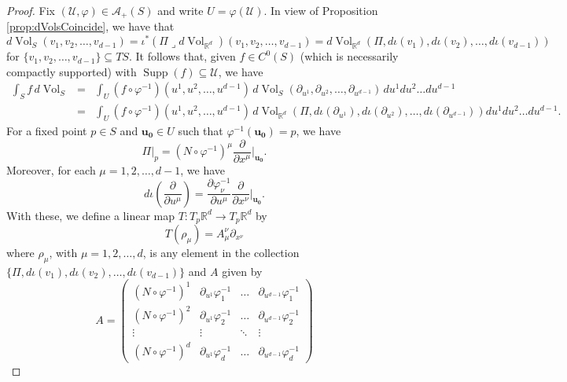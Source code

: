\documentclass{article}
\newcommand\supp{\operatorname{Supp}}
\newcommand{\p}{\partial}
\newcommand{\R}{\mathbb{R}}
\newcommand{\f}[2]{\frac{#1}{#2}}
\newcommand{\lp}{\left(}
\newcommand{\rp}{\right)}
\newcommand{\iprod}{\mathbin{\lrcorner}}
\theoremstyle{theorem}
\newcommand{\Vol}{\operatorname{Vol}}
\begin{document}
\begin{proof}
Fix $(\mathcal{U}, \varphi)\in\mathcal{A}_+(S)$ and write $U=\varphi(\mathcal{U})$. In view of Proposition \ref{prop:dVolsCoincide}, we have that
\begin{equation*}
    d\Vol_S(v_1,v_2,\dots, v_{d-1}) = \iota^*(\Pi \iprod d\Vol_{\R^d})(v_1,v_2,\dots, v_{d-1}) = d\Vol_{\R^d}(\Pi, d\iota(v_1),d\iota(v_2),\dots, d\iota(v_{d-1}))
\end{equation*}
for $\{v_1,v_2,\dots,v_{d-1}\} \subseteq TS$. It follows that, given $f\in C^0(S)$ (which is necessarily compactly supported) with $\supp(f)\subseteq \mathcal{U}$, we have
\begin{eqnarray}\label{eq:dVolS}
\int_S f\,d\Vol_S&=&\int_U(f\circ\varphi^{-1})(u^1,u^2,\dots,u^{d-1})\,d\Vol_S(\partial_{u^1},\partial_{u^2},\dots,\partial_{u^{d-1}})\,du^1du^2\dots du^{d-1}\\
&=& \int_U(f\circ\varphi^{-1})(u^1,u^2,\dots,u^{d-1})\,d\Vol_{\R^d}(\Pi, d\iota(\p_{u^1}), d\iota(\p_{u^2})  ,\dots, d\iota(\p_{u^{d-1}}) )du^1du^2\dots du^{d-1}.\nonumber
\end{eqnarray}
For a fixed point $p\in S$ and $\mathbf{u_0}\in U$ such that $\varphi^{-1}(\mathbf{u_0}) = p$, we have
\begin{equation*}
    \Pi\bigg\vert_p = (N\circ\varphi^{-1})^\mu \f{\p}{\p x^\mu}\bigg\vert_{\mathbf{u_0}}.
\end{equation*}
Moreover, for each $\mu = 1,2,\dots, d-1$, we have
\begin{equation*}
    d\iota\lp \f{\p}{\p u^\mu} \rp = \f{\p \varphi_\nu^{-1}}{\p u^\mu} \f{\p}{\p x^\nu}\bigg\vert_{\mathbf{u_0}}.
\end{equation*}
With these, we define a linear map $T: T_p \R^d \to T_p \R^d$ by 
\begin{equation*}
    T(\rho_\mu) = A_\mu^\nu \p_{x^\nu}
\end{equation*}
where $\rho_\mu$, with $\mu = 1,2,\dots,d$, is any element in the collection $\{ \Pi, d\iota(v_1), d\iota(v_2),\dots, d\iota(v_{d-1}) \}$ and $A$ given by 
\begin{equation*}
    A = \begin{pmatrix}
    (N\circ\varphi^{-1})^1&\p_{u^1}\varphi^{-1}_1&\dots&\p_{u^{d-1}} \varphi^{-1}_{1}\\
    (N\circ\varphi^{-1})^2&\p_{u^1}\varphi^{-1}_2&\dots&\p_{u^{d-1}} \varphi^{-1}_{2}\\
    \vdots&\vdots&\ddots& \vdots \\
    (N\circ\varphi^{-1})^d&\p_{u^1}\varphi^{-1}_d&\dots&\p_{u^{d-1}} \varphi^{-1}_{d}

\end{pmatrix}
\end{equation*}
\end{proof}
\end{document}
